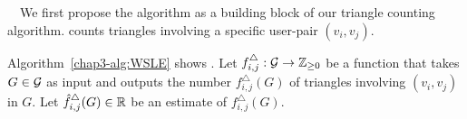 {}~~We first
propose
the \AlgWSLE{} algorithm
as a building block of our triangle counting algorithm.
\AlgWSLE{} counts
triangles involving a specific user-pair $(v_i,v_j)$.

Algorithm~\ref{chap3-alg:WSLE} shows \AlgWSLE{}.
Let $f_{i,j}^\triangle: \mathcal{G} \rightarrow \mathbb{Z}_{\ge0}$ be a function that takes $G \in \mathcal{G}$ as input and outputs the number $f_{i,j}^\triangle(G)$ of triangles involving $(v_i,v_j)$ in $G$.
Let $\hat{f}_{i,j}^\triangle(G) \in \mathbb{R}$ be an estimate of $f_{i,j}^\triangle(G)$.

